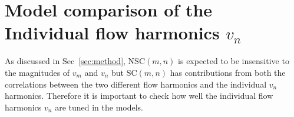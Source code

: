 \appendix
\section{Model comparison of the Individual flow harmonics $v_n$}
As discussed in Sec~\ref{sec:method}, NSC$(m,n)$ is expected to be insensitive to the magnitudes of $v_{m}$ and $v_{n}$ but SC$(m,n)$ has contributions from both the correlations between the two different flow harmonics and the individual $v_{n}$ harmonics. Therefore it is important to check how well the individual flow harmonics $v_n$ are tuned in the models.

\begin{figure}[h]
            \begin{center}

\end{center}
\end{figure}
